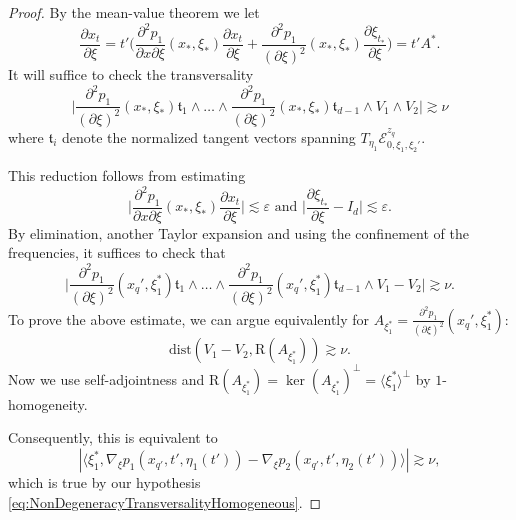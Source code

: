 \documentclass{amsart}
\theoremstyle{definition}
\begin{document}
\begin{proof}
By the mean-value theorem we let
\begin{equation*}
\frac{\partial x_t}{\partial \xi} = t' \big( \frac{\partial^2 p_1}{\partial x \partial \xi}(x_*,\xi_*) \frac{\partial x_t}{\partial \xi} + \frac{\partial^2 p_1}{(\partial \xi)^2}(x_*,\xi_*) \frac{\partial \xi_{t_*}}{\partial \xi} \big) = t' A^*.
\end{equation*}
It will suffice to check the transversality
\begin{equation}
\label{eq:TransveralityHomAux}
\big| \frac{\partial^2 p_1}{(\partial \xi)^2}(x_*,\xi_*) \mathfrak{t}_1 \wedge \ldots \wedge \frac{\partial^2 p_1}{(\partial \xi)^2}(x_*,\xi_*) \mathfrak{t}_{d-1} \wedge V_1 \wedge V_2 \big| \gtrsim \nu
\end{equation}
where $\mathfrak{t}_i$ denote the normalized tangent vectors spanning $T_{\eta_1} \mathcal{E}_{0,\xi_1,\xi_2'}^{z_q}$.

This reduction follows from estimating
\begin{equation*}
\big| \frac{\partial^2 p_1}{\partial x \partial \xi}(x_*,\xi_*) \frac{\partial x_t}{\partial \xi} \big| \lesssim \varepsilon \text{ and } \big| \frac{\partial \xi_{t_*}}{\partial \xi} - I_d \big| \lesssim \varepsilon.
\end{equation*}
By elimination, another Taylor expansion and using the confinement of the frequencies, it suffices to check that
\begin{equation*}
\big| \frac{\partial^2 p_1}{(\partial \xi)^2}(x_q',\xi_1^*) \mathfrak{t}_1 \wedge \ldots \wedge \frac{\partial^2 p_1}{(\partial \xi)^2}(x_q',\xi_1^*) \mathfrak{t}_{d-1} \wedge V_1 - V_2 \big| \gtrsim \nu.
\end{equation*}
To prove the above estimate, we can argue equivalently for $A_{\xi_1^*} = \frac{\partial^2 p_1}{(\partial \xi)^2}(x_q',\xi_1^*)$:
\begin{equation*}
\text{dist}(V_1-V_2,\text{R}(A_{\xi_1^*})) \gtrsim \nu.
\end{equation*}
Now we use self-adjointness and $\text{R}(A_{\xi_1^*}) = \ker(A_{\xi_1^*})^{\perp} = \langle \xi_1^* \rangle^{\perp}$ by $1$-homogeneity.

Consequently, this is equivalent to
\begin{equation*}
|\langle \xi_1^*, \nabla_{\xi} p_1(x_{q'},t',\eta_1(t')) - \nabla_{\xi} p_2(x_{q'},t',\eta_2(t')) \rangle| \gtrsim \nu,
\end{equation*}
which is true by our hypothesis \eqref{eq:NonDegeneracyTransversalityHomogeneous}.
\end{proof}
\end{document}
